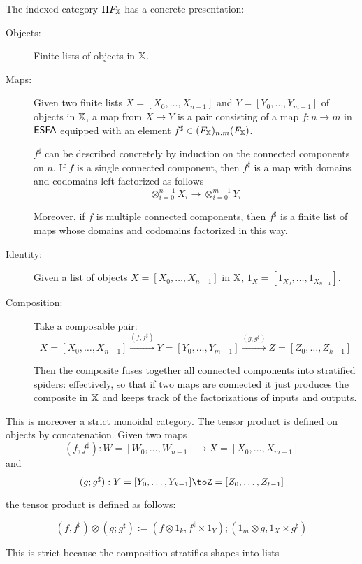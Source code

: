 \documentclass[12pt]{ociamthesis}  %
\begin{document}
\begin{lemma}
The indexed category $\Pi F_{\mathbb{X}}$ has a concrete presentation:

\begin{description}
\item[Objects:] Finite lists of objects in $\mathbb{X}$.
\item[Maps:] Given two finite lists $X=[X_0,\ldots, X_{n-1}]$ and $Y=[Y_0,\ldots, Y_{m-1}]$ of objects in $\mathbb{X}$, a map from $X\to Y$ is a pair consisting of a map $f:n\to m$ in ${\sf ESFA}$ equipped with an element $f^\sharp \in  (F_{\mathbb{X}})_{n,m}( F_{\mathbb{X}})$.


$f^\sharp$ can be described concretely by induction on the connected components on $n$. If $f$ is a single connected component, then $f^\sharp$ is a map with domains and codomains left-factorized as follows
$$\otimes_{i=0}^{n-1} X_i \to \otimes_{i=0}^{m-1} Y_i$$

Moreover, if $f$ is multiple connected components, then $f^\sharp$ is a finite list of maps whose domains and codomains factorized in this way.


\item[Identity:] Given a list of objects $X=[X_0,\ldots, X_{n-1}]$  in $\mathbb{X}$, $1_X=[1_{X_0},\ldots, 1_{X_{n-1}}]$.


\item[Composition:] Take a composable pair:
$$X=[X_0,\ldots, X_{n-1}] \xrightarrow{(f,f^\sharp)} Y=[Y_0,\ldots, Y_{m-1}] \xrightarrow{(g,g^\sharp)} Z=[Z_0,\ldots, Z_{k-1}]$$

Then the composite fuses together all connected components into stratified spiders:  effectively, so that if two maps are connected it just produces the composite in $\mathbb{X}$ and keeps track of the factorizations of inputs and outputs.

\end{description}

This is moreover a strict monoidal category.  The tensor product is defined on objects by concatenation.
Given two maps 
$$(f,f^\sharp):W=[W_0,\ldots, W_{n-1}]\to X=[X_{0},\ldots, X_{m-1}]$$
and
$$(g;g^\sharp):Y=[Y_0,\ldots, Y_{k-1}]\toZ= [Z_{0},\ldots, Z_{\ell-1}]$$

the tensor product is defined as follows:

$$
(f,f^\sharp)\otimes(g;g^\sharp)
:=
(f\otimes 1_k, f^\sharp\times 1_Y );(1_m\otimes g, 1_X\times g^\sharp)
$$

This is strict because the composition stratifies shapes into lists


\end{lemma}
\end{document}
